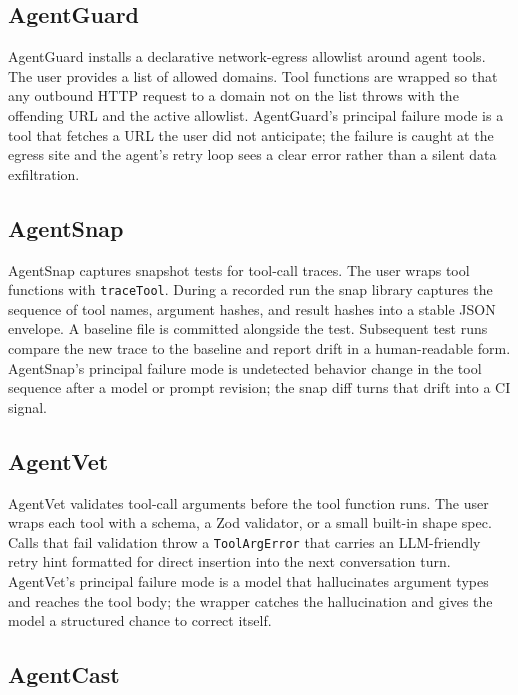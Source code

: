\documentclass[11pt]{article}
\begin{document}
\subsection{AgentGuard}


AgentGuard installs a declarative network-egress allowlist around agent tools. The user provides a list of allowed domains. Tool functions are wrapped so that any outbound HTTP request to a domain not on the list throws with the offending URL and the active allowlist. AgentGuard's principal failure mode is a tool that fetches a URL the user did not anticipate; the failure is caught at the egress site and the agent's retry loop sees a clear error rather than a silent data exfiltration.

\subsection{AgentSnap}


AgentSnap captures snapshot tests for tool-call traces. The user wraps tool functions with \texttt{traceTool}. During a recorded run the snap library captures the sequence of tool names, argument hashes, and result hashes into a stable JSON envelope. A baseline file is committed alongside the test. Subsequent test runs compare the new trace to the baseline and report drift in a human-readable form. AgentSnap's principal failure mode is undetected behavior change in the tool sequence after a model or prompt revision; the snap diff turns that drift into a CI signal.

\subsection{AgentVet}


AgentVet validates tool-call arguments before the tool function runs. The user wraps each tool with a schema, a Zod validator, or a small built-in shape spec. Calls that fail validation throw a \texttt{ToolArgError} that carries an LLM-friendly retry hint formatted for direct insertion into the next conversation turn. AgentVet's principal failure mode is a model that hallucinates argument types and reaches the tool body; the wrapper catches the hallucination and gives the model a structured chance to correct itself.

\subsection{AgentCast}
\end{document}
